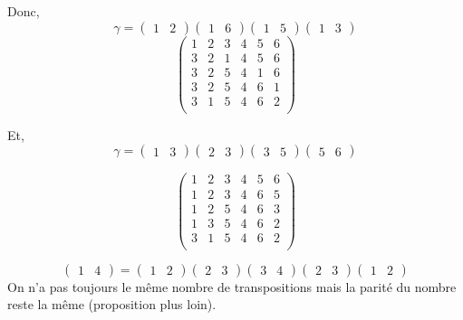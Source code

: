 \begin{exm}
	Donc, \[
		\gamma = \begin{pmatrix}
			1&2
		\end{pmatrix} \begin{pmatrix}
			1&6
		\end{pmatrix} \begin{pmatrix}
			1&5
		\end{pmatrix} \begin{pmatrix}
			1&3
		\end{pmatrix}
	\] 
	\[
		\begin{pmatrix}
			1&2&3&4&5&6\\
			3&2&1&4&5&6\\
			3&2&5&4&1&6\\
			3&2&5&4&6&1\\
			3&1&5&4&6&2\\
		\end{pmatrix}
	\]

	Et, \[
		\gamma = \begin{pmatrix}
			1&3
		\end{pmatrix} \begin{pmatrix}
			2&3
		\end{pmatrix} \begin{pmatrix}
			3&5
		\end{pmatrix} \begin{pmatrix}
			5&6
		\end{pmatrix} 
	\]

	\[
		\begin{pmatrix}
			1&2&3&4&5&6\\
			1&2&3&4&6&5\\
			1&2&5&4&6&3\\
			1&3&5&4&6&2\\
			3&1&5&4&6&2\\
		\end{pmatrix} 
	\] 
\end{exm}

\begin{exm}
	\[
		\begin{pmatrix}
			1&4
		\end{pmatrix} = \begin{pmatrix}
			1&2
		\end{pmatrix} \begin{pmatrix}
			2&3
		\end{pmatrix} \begin{pmatrix}
			3&4
		\end{pmatrix} \begin{pmatrix}
			2&3
		\end{pmatrix} \begin{pmatrix}
			1&2
		\end{pmatrix}
	\]
	On n'a pas toujours le même nombre de transpositions mais la parité du nombre reste la même (proposition plus loin).
\end{exm}

